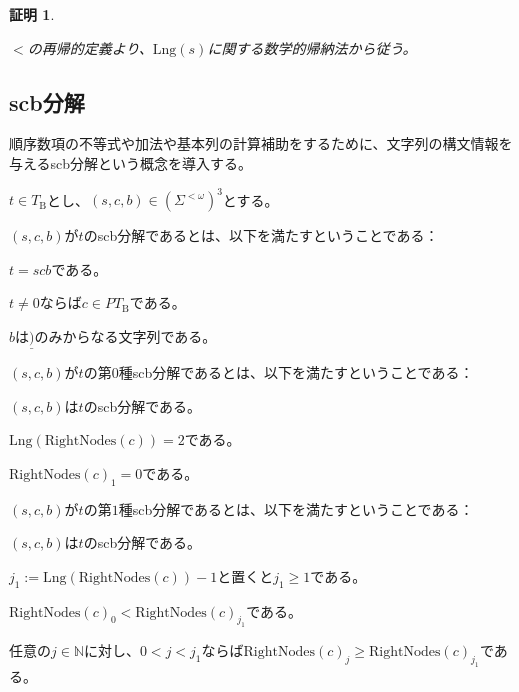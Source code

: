 \documentclass[dvipdfmx,uplatex]{jsarticle}
\theoremstyle{customnonumberbreakfortheorem}
\theoremstyle{customnonumberbreakforproof}
\newtheorem{hideableproof}{証明}
\begin{document}
\begin{hideableproof}
	\begin{indented}
		\item \(<\)の再帰的定義より、\(\textrm{Lng}(s)\)に関する数学的帰納法から従う。
	\end{indented}
\end{hideableproof}


\subsection{scb分解}

順序数項の不等式や加法や基本列の計算補助をするために、文字列の構文情報を与えるscb分解という概念を導入する。

\(t \in T_{\textrm{B}}\)とし、\((s,c,b) \in (\Sigma^{< \omega})^3\)とする。
\begin{nenumerate}
	\item \((s,c,b)\)が\(t\)のscb分解であるとは、以下を満たすということである：
	\begin{nenumerate}
		\item \(t = scb\)である。
		\item \(t \neq 0\)ならば\(c \in PT_{\textrm{B}}\)である。
		\item \(b\)は\(\underline{)}\)のみからなる文字列である。
	\end{nenumerate}
	\item \((s,c,b)\)が\(t\)の第\(0\)種scb分解であるとは、以下を満たすということである：
	\begin{nenumerate}
		\item \((s,c,b)\)は\(t\)のscb分解である。
		\item \(\textrm{Lng}(\textrm{RightNodes}(c)) = 2\)である。
		\item \(\textrm{RightNodes}(c)_1 = 0\)である。
	\end{nenumerate}
	\item \((s,c,b)\)が\(t\)の第\(1\)種scb分解であるとは、以下を満たすということである：
	\begin{nenumerate}
		\item \((s,c,b)\)は\(t\)のscb分解である。
		\item \(j_1 := \textrm{Lng}(\textrm{RightNodes}(c))-1\)と置くと\(j_1 \geq 1\)である。
		\item \(\textrm{RightNodes}(c)_0 < \textrm{RightNodes}(c)_{j_1}\)である。
		\item 任意の\(j \in \mathbb{N}\)に対し、\(0 < j < j_1\)ならば\(\textrm{RightNodes}(c)_j \geq \textrm{RightNodes}(c)_{j_1}\)である。
	\end{nenumerate}
\end{nenumerate}
\end{document}
